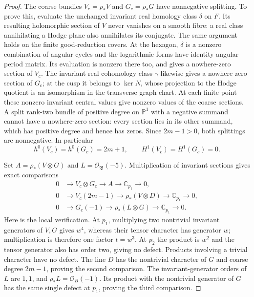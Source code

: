 \begin{proof}
The coarse bundles $V_c=\rho_*V$ and $G_c=\rho_*G$ have
nonnegative splitting. To prove this, evaluate the unchanged
invariant real homology class $\delta$ on $F$. Its resulting
holomorphic section of $V$ never vanishes on a smooth fibre:
a real class annihilating a Hodge plane also annihilates its
conjugate. The same argument holds on the finite good-reduction
covers. At the hexagon, $\delta$ is a nonzero combination of
angular cycles and the logarithmic forms have identity angular
period matrix. Its evaluation is nonzero there too, and gives
a nowhere-zero section of $V_c$. The invariant real cohomology
class $\gamma$ likewise gives a nowhere-zero section of $G_c$;
at the cusp it belongs to $\ker N$, whose projection to the
Hodge quotient is an isomorphism in the transverse graph chart.
At each finite point these nonzero invariant central values give
nonzero values of the coarse sections. A split rank-two bundle
of positive degree on $\mathbb P^1$ with a negative summand
cannot have a nowhere-zero section: every section lies in its
other summand, which has positive degree and hence has zeros.
Since $2m-1>0$, both splittings are nonnegative. In particular
\begin{equation}\label{cdp:eq:E15-positive}
 h^0(V_c)=h^0(G_c)=2m+1,\qquad H^1(V_c)=H^1(G_c)=0.
\end{equation}

Set $A=\rho_*(V\otimes G)$ and $L=\mathcal O_{\mathfrak B}(-5)$.
Multiplication of invariant sections gives exact comparisons
\begin{equation}\label{cdp:eq:E15-products}
\begin{split}
 0&\longrightarrow V_c\otimes G_c\longrightarrow A
       \longrightarrow\mathbb C_{p_1}\longrightarrow0,\\
 0&\longrightarrow V_c(2m-1)\longrightarrow\rho_*(V\otimes D)
       \longrightarrow\mathbb C_{p_1}\longrightarrow0,\\
 0&\longrightarrow G_c(-1)\longrightarrow\rho_*(L\otimes G)
       \longrightarrow\mathbb C_{p_1}\longrightarrow0.
\end{split}
\end{equation}
Here is the local verification. At $p_1$, multiplying two
nontrivial invariant generators of $V,G$ gives $w^4$, whereas
their tensor character has generator $w$; multiplication is
therefore one factor $t=w^3$. At $p_2$ the product is $w^2$
and the tensor generator also has order two, giving no defect.
Products involving a trivial character have no defect. The
line $D$ has the nontrivial character of $G$ and coarse degree
$2m-1$, proving the second comparison. The invariant-generator
orders of $L$ are $1,1$, and $\rho_*L=\mathcal O_B(-1)$.
Its product with the nontrivial generator of $G$ has the same
single defect at $p_1$, proving the third comparison.


\end{proof}
